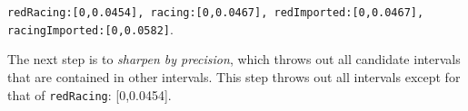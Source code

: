 {\tt redRacing:[0,0.0454], racing:[0,0.0467], redImported:[0,0.0467], racingImported:[0,0.0582]}.

The next step is to {\em sharpen by precision}, which throws out all
candidate intervals that are contained in other intervals.  This step
throws out all intervals except for that of {\tt redRacing}: [0,0.0454].




